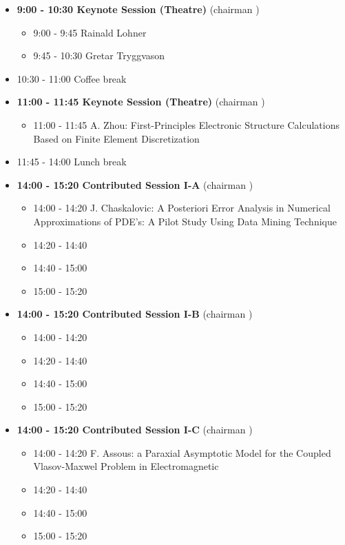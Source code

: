 \documentclass[10pt, A4]{article}%
\begin{document}
\begin{itemize}    
  \item {\bf 9:00 - 10:30 Keynote Session (Theatre)} (chairman ) 
  \begin{itemize}
    \item 9:00 - 9:45 Rainald Lohner
    \item 9:45 - 10:30 Gretar Tryggvason
  \end{itemize}
  \item 10:30 - 11:00 Coffee break
  \item {\bf 11:00 - 11:45 Keynote Session (Theatre)} (chairman ) 
  \begin{itemize}
    \item 11:00 - 11:45 {A. Zhou}: {First-Principles Electronic Structure Calculations Based on Finite Element Discretization}
  \end{itemize}
  \item 11:45 - 14:00 Lunch break      
  \item {\bf 14:00 - 15:20 Contributed Session I-A} (chairman ) 
  \begin{itemize}
    \item 14:00 - 14:20 {J. Chaskalovic}: {A Posteriori Error Analysis in Numerical Approximations of PDE's: A Pilot Study Using Data Mining Technique}
    \item 14:20 - 14:40 
    \item 14:40 - 15:00 
    \item 15:00 - 15:20 
  \end{itemize}
  \item {\bf 14:00 - 15:20 Contributed Session I-B} (chairman ) 
  \begin{itemize}
    \item 14:00 - 14:20 
    \item 14:20 - 14:40 
    \item 14:40 - 15:00 
    \item 15:00 - 15:20 
  \end{itemize}
    \item {\bf 14:00 - 15:20 Contributed Session I-C} (chairman ) 
  \begin{itemize}
    \item 14:00 - 14:20 {F. Assous}: {a Paraxial Asymptotic Model for the Coupled Vlasov-Maxwel Problem in Electromagnetic}
    \item 14:20 - 14:40 
    \item 14:40 - 15:00 
    \item 15:00 - 15:20 
  \end{itemize}

\end{itemize}
\end{document}
